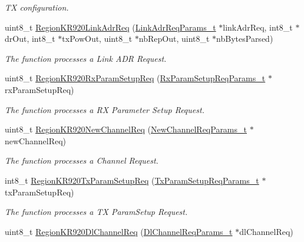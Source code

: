 \begin{DoxyCompactItemize}
\begin{DoxyCompactList}\small\item\em TX configuration. \end{DoxyCompactList}\item 
uint8\+\_\+t \mbox{\hyperlink{group___r_e_g_i_o_n_k_r920_ga6b2ee965ec46d0c137845d75edc16fd8}{Region\+K\+R920\+Link\+Adr\+Req}} (\mbox{\hyperlink{group___r_e_g_i_o_n_gad4af503e8d4de1846129e26a799a1e8e}{Link\+Adr\+Req\+Params\+\_\+t}} $\ast$link\+Adr\+Req, int8\+\_\+t $\ast$dr\+Out, int8\+\_\+t $\ast$tx\+Pow\+Out, uint8\+\_\+t $\ast$nb\+Rep\+Out, uint8\+\_\+t $\ast$nb\+Bytes\+Parsed)
\begin{DoxyCompactList}\small\item\em The function processes a Link A\+DR Request. \end{DoxyCompactList}\item 
uint8\+\_\+t \mbox{\hyperlink{group___r_e_g_i_o_n_k_r920_gabf2aca4c3d3b1bbe87d18a1b218fbe3b}{Region\+K\+R920\+Rx\+Param\+Setup\+Req}} (\mbox{\hyperlink{group___r_e_g_i_o_n_ga7165f282c670c728c36d534df2285157}{Rx\+Param\+Setup\+Req\+Params\+\_\+t}} $\ast$rx\+Param\+Setup\+Req)
\begin{DoxyCompactList}\small\item\em The function processes a RX Parameter Setup Request. \end{DoxyCompactList}\item 
uint8\+\_\+t \mbox{\hyperlink{group___r_e_g_i_o_n_k_r920_gab6853b28eeb36ffabfe8c7c77bcd305d}{Region\+K\+R920\+New\+Channel\+Req}} (\mbox{\hyperlink{group___r_e_g_i_o_n_gae2abcdb6dbb843c9faf5fd3009eca9d6}{New\+Channel\+Req\+Params\+\_\+t}} $\ast$new\+Channel\+Req)
\begin{DoxyCompactList}\small\item\em The function processes a Channel Request. \end{DoxyCompactList}\item 
int8\+\_\+t \mbox{\hyperlink{group___r_e_g_i_o_n_k_r920_ga97e34a3dd6ff9962dfc73cbeadb5119d}{Region\+K\+R920\+Tx\+Param\+Setup\+Req}} (\mbox{\hyperlink{group___r_e_g_i_o_n_ga26836ef2996e70410e42ef471073f855}{Tx\+Param\+Setup\+Req\+Params\+\_\+t}} $\ast$tx\+Param\+Setup\+Req)
\begin{DoxyCompactList}\small\item\em The function processes a TX Param\+Setup Request. \end{DoxyCompactList}\item 
uint8\+\_\+t \mbox{\hyperlink{group___r_e_g_i_o_n_k_r920_gaf071acd0ac6c6839c90ff7ee9192fbf6}{Region\+K\+R920\+Dl\+Channel\+Req}} (\mbox{\hyperlink{group___r_e_g_i_o_n_gae0d608ff1f8ea0a430e4f9a4c38ec7f3}{Dl\+Channel\+Req\+Params\+\_\+t}} $\ast$dl\+Channel\+Req)

\end{DoxyCompactItemize}
